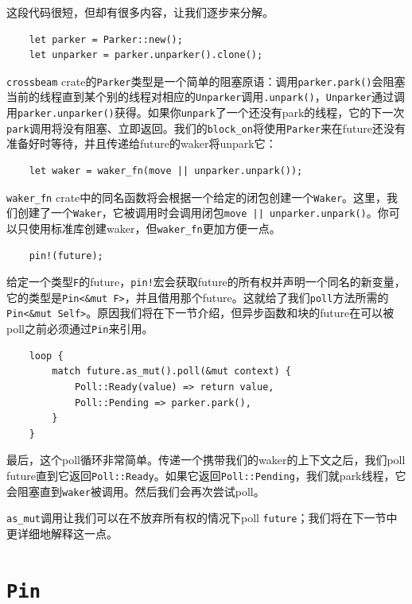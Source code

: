 这段代码很短，但却有很多内容，让我们逐步来分解。

\begin{verbatim}
    let parker = Parker::new();
    let unparker = parker.unparker().clone();
\end{verbatim}

\texttt{crossbeam} crate的\texttt{Parker}类型是一个简单的阻塞原语：调用\texttt{parker.park()}会阻塞当前的线程直到某个别的线程对相应的\texttt{Unparker}调用\texttt{.unpark()}，\texttt{Unparker}通过调用\texttt{parker.unparker()}获得。如果你\texttt{unpark}了一个还没有park的线程，它的下一次\texttt{park}调用将没有阻塞、立即返回。我们的\texttt{block\_on}将使用\texttt{Parker}来在future还没有准备好时等待，并且传递给future的waker将unpark它：
\begin{verbatim}
    let waker = waker_fn(move || unparker.unpark());
\end{verbatim}

\texttt{waker\_fn} crate中的同名函数将会根据一个给定的闭包创建一个\texttt{Waker}。这里，我们创建了一个\texttt{Waker}，它被调用时会调用闭包\texttt{move || unparker.unpark()}。你可以只使用标准库创建waker，但\texttt{waker\_fn}更加方便一点。

\begin{verbatim}
    pin!(future);
\end{verbatim}
给定一个类型\texttt{F}的future，\texttt{pin!}宏会获取future的所有权并声明一个同名的新变量，它的类型是\texttt{Pin<\&mut F>}，并且借用那个future。这就给了我们\texttt{poll}方法所需的\texttt{Pin<\&mut Self>}。原因我们将在下一节介绍，但异步函数和块的future在可以被poll之前必须通过\texttt{Pin}来引用。

\begin{verbatim}
    loop {
        match future.as_mut().poll(&mut context) {
            Poll::Ready(value) => return value,
            Poll::Pending => parker.park(),
        }
    }
\end{verbatim}

最后，这个poll循环非常简单。传递一个携带我们的waker的上下文之后，我们poll future直到它返回\texttt{Poll::Ready}。如果它返回\texttt{Poll::Pending}，我们就park线程，它会阻塞直到\texttt{waker}被调用。然后我们会再次尝试poll。

\texttt{as\_mut}调用让我们可以在不放弃所有权的情况下poll \texttt{future}；我们将在下一节中更详细地解释这一点。

\section{\texttt{Pin}}

